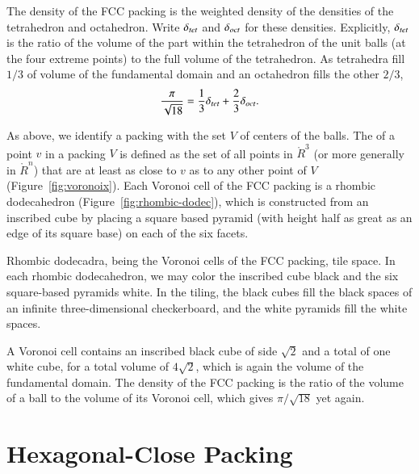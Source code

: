 \figSEYIMIE %

\figAZGXQWC %

The density of the FCC packing is the weighted density
of the densities of the tetrahedron and octahedron.  Write $\delta_{tet}$ and
$\delta_{oct}$ for these densities.  Explicitly, $\delta_{tet}$ is the ratio of the
volume of the part within the tetrahedron of the unit balls (at the
four extreme points) to the full volume of the tetrahedron.  As tetrahedra fill
$1/3$ of volume of the fundamental domain and an octahedron fills
the other $2/3$,
\[ 
  \frac{\pi}{\sqrt{18}} = \frac{1}{3}\delta_{tet} + \frac{2}{3}\delta_{oct}.
\] 

As above, we identify a packing with the set $V$ of centers of the
balls.  The  
of a point $v$ in a packing $V$ is
defined as the set of all points in $\ring{R}^3$ (or more generally in
$\ring{R}^n$) that are at least as close to $v$ as to any other point
of $V$ (Figure~\ref{fig:voronoix}).  Each Voronoi cell of the FCC
packing is a rhombic dodecahedron
(Figure~\ref{fig:rhombic-dodec}),
which is constructed from an inscribed cube by placing a square based pyramid
(with height half as great as an edge of its square base) on each of
the six facets.

%

\figEVIAIQPx %

\figPQJIJGE %

Rhombic dodecadra, being the Voronoi cells of the FCC packing, tile space.
In each rhombic dodecahedron, we 
may color the inscribed cube black and the six square-based pyramids
white.  In the tiling, 
the black cubes fill the black spaces of an infinite three-dimensional
checkerboard, and the white pyramids fill the white spaces.

A Voronoi cell contains an inscribed black cube of side $\sqrt2$ and a total
of one white cube, for a total volume of $4\sqrt2$, which is
again the volume of the fundamental domain.  The density of the
FCC packing is the ratio of the volume of a ball to the volume
of its Voronoi cell, which gives $\pi/\sqrt{18}$ yet again.



\section{Hexagonal-Close Packing}\label{sec:hcp}


